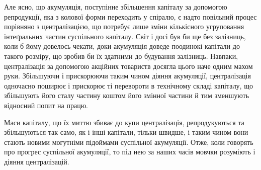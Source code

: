 Але ясно, що акумуляція, поступінне збільшення капіталу
за допомогою репродукції, яка з колової форми переходить у
спіралю, є надто повільний процес порівняно з централізацією,
що потребує лише зміни кількісного угруповання інтеґральних
частин суспільного капіталу. Світ і досі був би ще без залізниць,
коли б йому довелось чекати, доки акумуляція доведе поодинокі
капітали до такого розміру, що зробив би їх здатними до будування
залізниць. Навпаки, централізація за допомогою акційних
товариств досягла цього наче одним махом руки. Збільшуючи
і прискорюючи таким чином діяння акумуляції, централізація
одночасно поширює і прискорює ті перевороти в технічному
складі капіталу, що збільшують його сталу частину коштом його
змінної частини й тим зменшують відносний попит на працю.

\label{original-538}Маси капіталу, що їх миттю збиває до купи централізація,
репродукуються та збільшуються так само, як і інші капітали,
тільки швидше, і таким чином вони стають новими могутніми
підоймами суспільної акумуляції. Отже, коли говорять про прогрес
суспільної акумуляції, то під нею за наших часів мовчки
розуміють і діяння централізацій.

